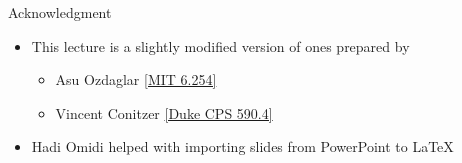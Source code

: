 \documentclass[11pt,aspectratio=169]{beamer}
\begin{document}
  
  \begin{frame}{Acknowledgment}
   \begin{itemize}
   \setlength{\itemsep}{1em}
    \item This lecture is a slightly modified version of ones prepared by
    \begin{itemize}
     \item Asu Ozdaglar \href{https://ocw.mit.edu/courses/electrical-engineering-and-computer-science/6-254-game-theory-with-engineering-applications-spring-2010/index.htm}{[MIT 6.254]}
     \item Vincent Conitzer \href{https://courses.cs.duke.edu/spring16/compsci590.4/}{[Duke CPS 590.4]}
    \end{itemize}
    \item Hadi Omidi helped with importing slides from PowerPoint to \LaTeX
   \end{itemize}
  \end{frame}
\end{document}
